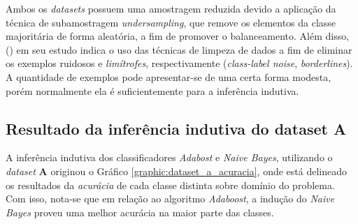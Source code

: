 Ambos os \textit{datasets} possuem uma amostragem reduzida devido a aplicação da 
técnica de subamostragem \textit{undersampling}, que remove os elementos da 
classe majoritária de forma aleatória, a fim de promover o balanceamento. 
Além disso,  (\citeyear{machado2009estudo}) 
em seu estudo indica o uso das técnicas de limpeza de dados a fim de eliminar 
os exemplos ruidosos e \textit{limítrofes}, respectivamente 
(\textit{class-label noise}, \textit{borderlines}). A quantidade de exemplos 
pode apresentar-se de uma certa forma modesta, porém normalmente ela é 
suficientemente para a inferência indutiva.

\subsection{Resultado da inferência indutiva do dataset A}


A inferência indutiva dos classificadores \textit{Adabost} e 
\textit{Naive Bayes}, utilizando o \textit{dataset} \textbf{A} originou o 
Gráfico \ref{graphic:dataset_a_acuracia}, onde está delineado os resultados da 
\textit{acurácia} de cada classe distinta sobre domínio do problema. Com isso, 
nota-se que em relação ao algoritmo \textit{Adaboost}, a indução do 
\textit{Naive Bayes} proveu uma melhor acurácia na maior parte das classes.


